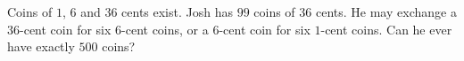 Coins of $1$, $6$ and $36$ cents exist. Josh has $99$ coins of $36$ cents. He may exchange a $36$-cent coin for six $6$-cent coins, or a $6$-cent coin for six $1$-cent coins. Can he ever have exactly $500$ coins?
